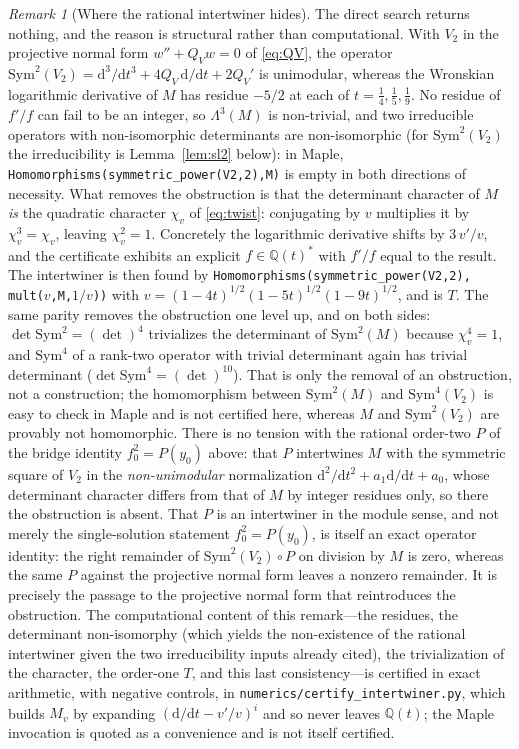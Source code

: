 \documentclass[11pt]{article}
\newcommand{\rmd}{\mathrm{d}}
\theoremstyle{plain}
\theoremstyle{remark}
\newtheorem{rem}[thm]{Remark}
\begin{document}
\begin{rem}[Where the rational intertwiner hides]
\label{rem:obstruction}
The direct search returns nothing, and the reason is structural rather than computational. With $V_2$ in the
projective normal form $w''+Q_Vw=0$ of \eqref{eq:QV}, the operator
$\mathrm{Sym}^2(V_2)=\rmd^3/\rmd t^3+4Q_V\,\rmd/\rmd t+2Q_V'$ is unimodular, whereas the Wronskian
logarithmic derivative of $M$ has residue $-5/2$ at each of $t=\tfrac14,\tfrac15,\tfrac19$. No residue of
$f'/f$ can fail to be an integer, so $\Lambda^3(M)$ is non-trivial, and two irreducible operators with
non-isomorphic determinants are non-isomorphic (for $\mathrm{Sym}^2(V_2)$ the irreducibility is
Lemma~\ref{lem:sl2} below): in Maple,
\texttt{Homomorphisms(symmetric\_power(V2,2),M)} is empty in both directions of necessity. What removes the
obstruction is that the determinant character of $M$ \emph{is} the quadratic character $\chi_v$ of
\eqref{eq:twist}: conjugating by $v$ multiplies it by $\chi_v^3=\chi_v$, leaving $\chi_v^2=1$. Concretely the
logarithmic derivative shifts by $3\,v'/v$, and the certificate exhibits an explicit $f\in\mathbb{Q}(t)^*$ with
$f'/f$ equal to the result. The intertwiner is then found by
\texttt{Homomorphisms(symmetric\_power(V2,2),\,mult($v$,M,$1/v$))} with
$v=(1-4t)^{1/2}(1-5t)^{1/2}(1-9t)^{1/2}$, and is $T$. The same parity removes the obstruction one level up, and
on both sides: $\det\mathrm{Sym}^2=(\det)^4$ trivializes the determinant of $\mathrm{Sym}^2(M)$ because
$\chi_v^4=1$, and $\mathrm{Sym}^4$ of a rank-two operator with trivial determinant again has trivial determinant
($\det\mathrm{Sym}^4=(\det)^{10}$).
That is only the removal of an obstruction, not a construction; the homomorphism between
$\mathrm{Sym}^2(M)$ and $\mathrm{Sym}^4(V_2)$ is easy to check in Maple and is not certified here,
whereas $M$ and $\mathrm{Sym}^2(V_2)$ are provably not homomorphic. There is no tension with the rational
order-two $P$ of the bridge identity
$f_0^2=P(y_0)$ above: that $P$ intertwines $M$ with the symmetric square of $V_2$ in the \emph{non-unimodular}
normalization $\rmd^2/\rmd t^2+a_1\rmd/\rmd t+a_0$, whose determinant character differs from that of $M$ by
integer residues only, so there the obstruction is absent. That $P$ is an intertwiner in the module sense,
and not merely the single-solution statement $f_0^2=P(y_0)$, is itself an exact operator identity: the right
remainder of $\mathrm{Sym}^2(V_2)\circ P$ on division by $M$ is zero, whereas the same $P$ against the
projective normal form leaves a nonzero remainder. It is precisely the passage to the projective
normal form that reintroduces the obstruction. The computational content of this remark---the residues, the
determinant non-isomorphy (which yields the non-existence of the rational intertwiner given the two
irreducibility inputs already cited), the trivialization of the character, the order-one $T$, and this
last consistency---is certified in exact arithmetic, with negative controls, in
\texttt{numerics/certify\_intertwiner.py}, which builds $M_v$ by expanding $(\rmd/\rmd t-v'/v)^i$ and so
never leaves $\mathbb{Q}(t)$; the Maple invocation is quoted as a convenience and is not itself certified.
\end{rem}
\end{document}
